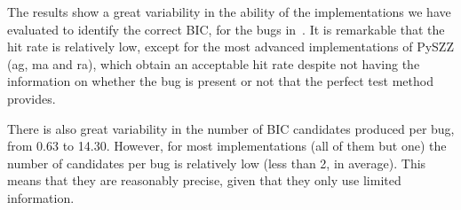 
The results show a great variability in the ability of the implementations we have evaluated to identify the correct BIC, for the bugs in~\datasetName. It is remarkable that the hit rate is relatively low, except for the most advanced implementations of PySZZ (ag, ma and ra), which obtain an acceptable hit rate despite not having the information on whether the bug is present or not that the perfect test method provides.

There is also great variability in the number of BIC candidates produced per bug, from 0.63 to 14.30. 
However, for most implementations (all of them but one) the number of candidates per bug is relatively low (less than 2, in average). 
This means that they are reasonably precise, given that they only use limited information.

